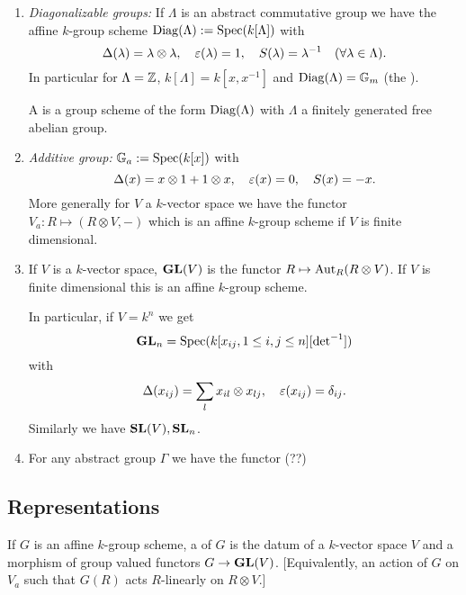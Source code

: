 \begin{example} \leavevmode
	\begin{enumerate}[(1)]
		\item \emph{Diagonalizable groups:} If $\Lambda$ is an abstract commutative group we
			have the affine $k$-group scheme $\operatorname{Diag}(\Lambda):=\operatorname{Spec}(k[\Lambda])$ with
			\[
				\Delta(\lambda) = \lambda \otimes \lambda,\quad \varepsilon(\lambda)=1,\quad
				S(\lambda)=\lambda^{-1}\quad (\forall \lambda\in \Lambda).
			\]
			In particular for $\Lambda=\mathbb Z$, $k[\Lambda]=k[x,x^{-1}]$ and $\operatorname{Diag}(\Lambda)=\mathbb{G}_m$ (the
			).

			A  is a group scheme of the form $\operatorname{Diag}(\Lambda)$ with $\Lambda$ a
			finitely generated free abelian group.
		\item \emph{Additive group:} $\mathbb{G}_a:=\operatorname{Spec}(k[x])$ with
			\[
				\Delta(x) = x\otimes 1 + 1\otimes x,\quad \varepsilon(x)=0,\quad S(x)=-x.
			\]
			More generally for $V$ a $k$-vector space we have the functor $V_{a}:R\mapsto
			(R\otimes V,-)$ which is an affine $k$-group scheme if $V$ is finite dimensional.
		\item If $V$ is a $k$-vector space, $\mathbf{GL}(V)$ is the functor $R\mapsto \Aut_R(R\otimes
			V)$. If $V$ is finite dimensional this is an affine $k$-group scheme.

			In particular, if $V=k^{n}$ we get
			\[
				\mathbf{GL}_n = \operatorname{Spec}(k[x_{ij},1\le i,j\le n][\operatorname{det}^{-1}])
			\]
			with
			\[
				\Delta(x_{ij}) = \sum_l x_{il}\otimes x_{lj},\quad \varepsilon(x_{ij}) = \delta_{ij}
			.\]
			Similarly we have $\mathbf{SL}(V), \mathbf{SL}_n$.
		\item For any abstract group $\Gamma$ we have the functor (??)
	\end{enumerate}
\end{example}

\subsection{Representations}

If $G$ is an affine $k$-group scheme, a  of $G$ is the datum of a
$k$-vector space $V$ and a morphism of group valued functors $G\to \GL(V)$.
[Equivalently, an action of $G$ on $V_{a}$ such that $G(R)$ acts $R$-linearly on $R\otimes V$.]

